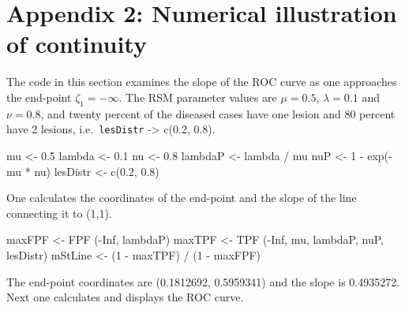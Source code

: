 \documentclass[
]{book}
\newenvironment{Shaded}{\begin{snugshade}}{\end{snugshade}}
\newcommand{\ConstantTok}[1]{\textcolor[rgb]{0.00,0.00,0.00}{#1}}
\newcommand{\DecValTok}[1]{\textcolor[rgb]{0.00,0.00,0.81}{#1}}
\newcommand{\FloatTok}[1]{\textcolor[rgb]{0.00,0.00,0.81}{#1}}
\newcommand{\FunctionTok}[1]{\textcolor[rgb]{0.00,0.00,0.00}{#1}}
\newcommand{\NormalTok}[1]{#1}
\newcommand{\OtherTok}[1]{\textcolor[rgb]{0.56,0.35,0.01}{#1}}
\newcommand{\SpecialCharTok}[1]{\textcolor[rgb]{0.00,0.00,0.00}{#1}}
\begin{document}
\hypertarget{rsm-pred-appendix2}{%
\section{Appendix 2: Numerical illustration of continuity}\label{rsm-pred-appendix2}}

The code in this section examines the slope of the ROC curve as one approaches the end-point \(\zeta_1 = -\infty\). The RSM parameter values are \(\mu = 0.5\), \(\lambda = 0.1\) and \(\nu = 0.8\), and twenty percent of the diseased cases have one lesion and 80 percent have 2 lesions, i.e.~\texttt{lesDistr} -\textgreater{} c(0.2, 0.8).

\begin{Shaded}
\begin{Highlighting}[]
\NormalTok{mu }\OtherTok{\textless{}{-}} \FloatTok{0.5}
\NormalTok{lambda }\OtherTok{\textless{}{-}} \FloatTok{0.1}
\NormalTok{nu }\OtherTok{\textless{}{-}} \FloatTok{0.8}
\NormalTok{lambdaP }\OtherTok{\textless{}{-}}\NormalTok{ lambda }\SpecialCharTok{/}\NormalTok{ mu}
\NormalTok{nuP }\OtherTok{\textless{}{-}} \DecValTok{1} \SpecialCharTok{{-}} \FunctionTok{exp}\NormalTok{(}\SpecialCharTok{{-}}\NormalTok{mu }\SpecialCharTok{*}\NormalTok{ nu)}
\NormalTok{lesDistr }\OtherTok{\textless{}{-}} \FunctionTok{c}\NormalTok{(}\FloatTok{0.2}\NormalTok{, }\FloatTok{0.8}\NormalTok{)}
\end{Highlighting}
\end{Shaded}

One calculates the coordinates of the end-point and the slope of the line connecting it to (1,1).

\begin{Shaded}
\begin{Highlighting}[]
\NormalTok{maxFPF }\OtherTok{\textless{}{-}} \FunctionTok{FPF}\NormalTok{ (}\SpecialCharTok{{-}}\ConstantTok{Inf}\NormalTok{, lambdaP)}
\NormalTok{maxTPF }\OtherTok{\textless{}{-}} \FunctionTok{TPF}\NormalTok{ (}\SpecialCharTok{{-}}\ConstantTok{Inf}\NormalTok{, mu, lambdaP, nuP, lesDistr)}
\NormalTok{mStLine }\OtherTok{\textless{}{-}}\NormalTok{ (}\DecValTok{1} \SpecialCharTok{{-}}\NormalTok{ maxTPF) }\SpecialCharTok{/}\NormalTok{ (}\DecValTok{1} \SpecialCharTok{{-}}\NormalTok{ maxFPF)}
\end{Highlighting}
\end{Shaded}

The end-point coordinates are (0.1812692, 0.5959341) and the slope is 0.4935272. Next one calculates and displays the ROC curve.
\end{document}
